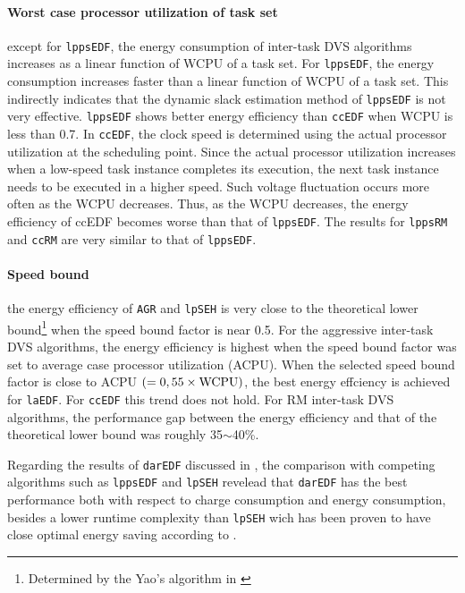 \documentclass[10pt,article]{IEEEtran}
\begin{document}
\paragraph{Worst case processor utilization of task set} except for \texttt{lppsEDF}, the energy consumption of inter-task DVS algorithms increases as a linear function of WCPU of a task  set. For \texttt{lppsEDF}, the energy consumption increases faster than a linear function of WCPU of a task set. This indirectly indicates that the dynamic slack estimation method of \texttt{lppsEDF} is not very effective. 
\texttt{lppsEDF} shows better energy efficiency than \texttt{ccEDF} when WCPU is less than 0.7. In \texttt{ccEDF}, the clock speed is determined using the actual processor utilization at the scheduling point.  Since the actual processor utilization increases when a low-speed task instance completes its execution, the next task instance needs to be executed in a higher speed. Such  voltage fluctuation occurs more often as the WCPU decreases. Thus, as the WCPU decreases, the energy efficiency of ccEDF becomes worse than that of \texttt{lppsEDF}. The results for \texttt{lppsRM} and \texttt{ccRM} are very similar to that of \texttt{lppsEDF}. 

\paragraph{Speed bound} the energy efficiency of \texttt{AGR} and \texttt{lpSEH} is very close to the theoretical lower bound\footnote{Determined by the Yao's algorithm in \cite{yao}} when the speed bound factor is near 0.5. For the aggressive inter-task DVS algorithms, the energy efficiency is highest when the speed bound factor was set to average case processor utilization (ACPU). When the selected speed bound factor is close to ACPU $(= 0,55 \times \textnormal{WCPU})$, the best energy effciency is achieved for \texttt{laEDF}. For \texttt{ccEDF} this trend does not hold. For RM inter-task DVS algorithms, the performance gap between the energy efficiency and that of the theoretical lower bound was roughly 35$\sim$40\%.

Regarding the results of \texttt{darEDF} discussed in \cite{zhuo-chakrabarti}, the comparison with competing algorithms such as \texttt{lppsEDF} and \texttt{lpSEH} revelead that \texttt{darEDF} has the best performance both with respect to charge consumption and energy consumption, besides a lower runtime complexity than \texttt{lpSEH} wich has been proven to have close optimal energy saving according to \cite{kim-2}.
\end{document}
